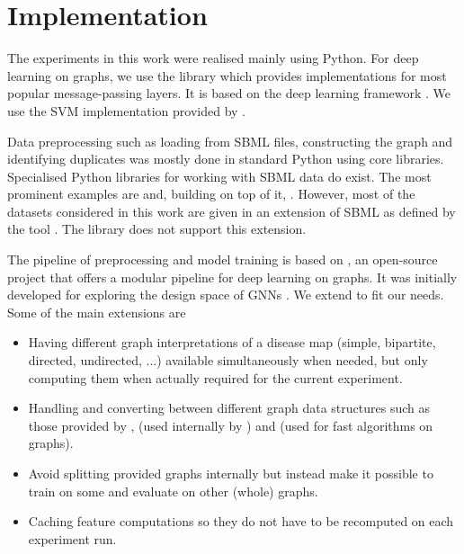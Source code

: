 \documentclass[
	fontsize=10pt, %
	twoside=false, %
	secnumdepth=1, %
  toc=indentunnumbered %
]{kaobook}
\begin{document}
\section{Implementation}

The experiments in this work were realised mainly using Python. For deep
learning on graphs, we use the library 
\cite{fey_FastGraphRepresentation_2019} which provides implementations for most
popular message-passing layers. It is based on the deep learning framework
 \cite{paszke_PyTorchImperativeStyle_2019}. We use the SVM
implementation provided by 
\cite{pedregosa_ScikitlearnMachineLearning_}.

Data preprocessing such as loading from SBML files, constructing the graph and
identifying duplicates was mostly done in standard Python using core libraries.
Specialised Python libraries for working with SBML data do exist. The most
prominent examples are 
\cite{bornstein_LibSBMLAPILibrary_2008} and, building on top of it,
 \cite{ebrahim_COBRApyCOnstraintsBasedReconstruction_2013}.
However, most of the datasets considered in this work are given in an extension
of SBML as defined by the tool . The 
library does not support this extension.

The pipeline of preprocessing and model training is based on 
\cite{noauthor_snap-stanfordgraphgym_2021}, an open-source project that offers a
modular pipeline for deep learning on graphs. It was initially developed for
exploring the design space of GNNs \cite{you_design_2020}. We extend
 to fit our needs. Some of the main extensions are
\begin{itemize}
\item Having different graph interpretations of a disease map (simple,
  bipartite, directed, undirected, ...) available simultaneously when needed,
  but only computing them when actually required for the current experiment.
\item Handling and converting between different graph data structures such as
  those provided by ,  (used internally by
  ) and  (used for fast algorithms on graphs).
\item Avoid splitting provided graphs internally but instead make it possible to
  train on some and evaluate on other (whole) graphs.
\item Caching feature computations so they do not have to be recomputed on each
  experiment run.
\end{itemize}
\end{document}

